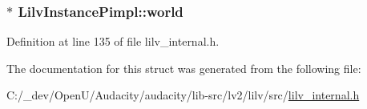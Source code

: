 \subsubsection[{\texorpdfstring{world}{world}}]{$\ast$ Lilv\+Instance\+Pimpl\+::world}\hypertarget{struct_lilv_instance_pimpl_a98074ac20d6ac57b1ac2d968984baaff}{}\label{struct_lilv_instance_pimpl_a98074ac20d6ac57b1ac2d968984baaff}


Definition at line 135 of file lilv\+\_\+internal.\+h.



The documentation for this struct was generated from the following file\+:\begin{DoxyCompactItemize}
\item 
C\+:/\+\_\+dev/\+Open\+U/\+Audacity/audacity/lib-\/src/lv2/lilv/src/\hyperlink{lilv__internal_8h}{lilv\+\_\+internal.\+h}\end{DoxyCompactItemize}
